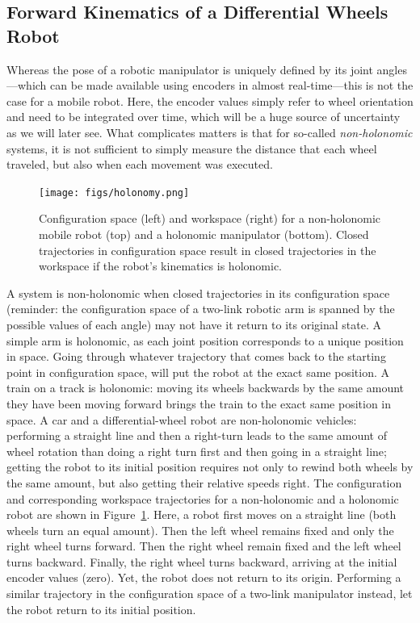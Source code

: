 \subsection{Forward Kinematics of a Differential Wheels Robot}\label{sec:fwkmobile}
Whereas the pose of a robotic manipulator is uniquely defined by its joint angles---which can be made available using encoders in almost real-time---this is not the case for a mobile robot. Here, the encoder values simply refer to wheel orientation and need to be integrated over time, which will be a huge source of uncertainty as we will later see.
What complicates matters is that for so-called \emph{non-holonomic} systems, it is not sufficient to simply measure the distance that each wheel traveled, but also when each movement was executed.

\begin{figure}[htb!]
	\centering
		\texttt{[image: figs/holonomy.png]}
	\caption{Configuration space (left) and workspace (right) for a non-holonomic mobile robot (top) and a holonomic manipulator (bottom). Closed trajectories in configuration space result in closed trajectories in the workspace if the robot's kinematics is holonomic.}
	\label{fig:holonomy}
\end{figure}

A system is non-holonomic when closed trajectories in its configuration space (reminder: the configuration space of a two-link robotic arm is spanned by the possible values of each angle) may not have it return to its original state.  A simple arm is holonomic, as each joint position corresponds to a unique position in space. Going through whatever trajectory that comes back to the starting point in configuration space, will put the robot at the exact same position. A train on  a track is holonomic: moving its wheels backwards by the same amount they have been moving forward brings the train to the exact same position in space. A car and a differential-wheel robot are non-holonomic vehicles: performing a straight line and then a right-turn leads to the same amount of wheel rotation than doing a right turn first and then going in a straight line; getting the robot to its initial position requires not only to rewind both wheels by the same amount, but also getting their relative speeds right. The configuration and corresponding workspace trajectories for a non-holonomic and a holonomic robot are shown in Figure~\ref{fig:holonomy}. Here, a robot first moves on a straight line (both wheels turn an equal amount). Then the left wheel remains fixed and only the right wheel turns forward. Then the right wheel remain fixed and the left wheel turns backward. Finally, the right wheel turns backward, arriving at the initial encoder values (zero). Yet, the robot does not return to its origin. Performing a similar trajectory in the configuration space of a two-link manipulator instead, let the robot return to its initial position.

